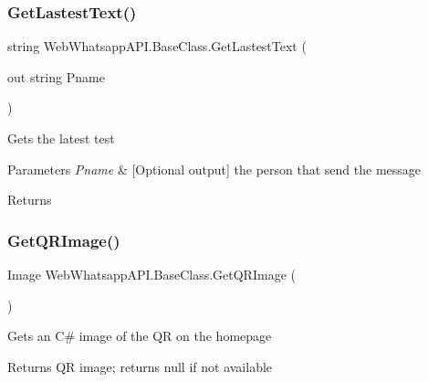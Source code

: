 \subsubsection{\texorpdfstring{Get\+Lastest\+Text()}{GetLastestText()}}
{\footnotesize\ttfamily string Web\+Whatsapp\+A\+P\+I.\+Base\+Class.\+Get\+Lastest\+Text (\begin{DoxyParamCaption}\item[{out string}]{Pname }\end{DoxyParamCaption})\hspace{0.3cm}{\ttfamily [inline]}}



Gets the latest test 


\begin{DoxyParams}{Parameters}
{\em Pname} & \mbox{[}Optional output\mbox{]} the person that send the message\\
\hline
\end{DoxyParams}
\begin{DoxyReturn}{Returns}

\end{DoxyReturn}
\mbox{\label{class_web_whatsapp_a_p_i_1_1_base_class_ac9738e95307e38b1ef493c1164edb60c}} 
\subsubsection{\texorpdfstring{Get\+Q\+R\+Image()}{GetQRImage()}}
{\footnotesize\ttfamily Image Web\+Whatsapp\+A\+P\+I.\+Base\+Class.\+Get\+Q\+R\+Image (\begin{DoxyParamCaption}{ }\end{DoxyParamCaption})\hspace{0.3cm}{\ttfamily [inline]}}



Gets an C\# image of the QR on the homepage 

\begin{DoxyReturn}{Returns}
QR image; returns null if not available
\end{DoxyReturn}
\mbox{\label{class_web_whatsapp_a_p_i_1_1_base_class_ad181052c89c24e15d53aa81c1afe531c}} 

